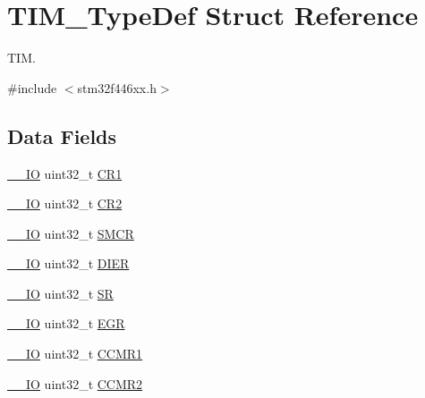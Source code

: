 \hypertarget{struct_t_i_m___type_def}{}\section{T\+I\+M\+\_\+\+Type\+Def Struct Reference}
\label{struct_t_i_m___type_def}


T\+IM.  




{\ttfamily \#include $<$stm32f446xx.\+h$>$}

\subsection*{Data Fields}
\begin{DoxyCompactItemize}
\item 
\mbox{\hyperlink{core__sc300_8h_aec43007d9998a0a0e01faede4133d6be}{\+\_\+\+\_\+\+IO}} uint32\+\_\+t \mbox{\hyperlink{struct_t_i_m___type_def_ab0ec7102960640751d44e92ddac994f0}{C\+R1}}
\item 
\mbox{\hyperlink{core__sc300_8h_aec43007d9998a0a0e01faede4133d6be}{\+\_\+\+\_\+\+IO}} uint32\+\_\+t \mbox{\hyperlink{struct_t_i_m___type_def_afdfa307571967afb1d97943e982b6586}{C\+R2}}
\item 
\mbox{\hyperlink{core__sc300_8h_aec43007d9998a0a0e01faede4133d6be}{\+\_\+\+\_\+\+IO}} uint32\+\_\+t \mbox{\hyperlink{struct_t_i_m___type_def_a2870732a4fc2ecd7bbecfbcbbf5528b7}{S\+M\+CR}}
\item 
\mbox{\hyperlink{core__sc300_8h_aec43007d9998a0a0e01faede4133d6be}{\+\_\+\+\_\+\+IO}} uint32\+\_\+t \mbox{\hyperlink{struct_t_i_m___type_def_a07fccbd85b91e6dca03ce333c1457fcb}{D\+I\+ER}}
\item 
\mbox{\hyperlink{core__sc300_8h_aec43007d9998a0a0e01faede4133d6be}{\+\_\+\+\_\+\+IO}} uint32\+\_\+t \mbox{\hyperlink{struct_t_i_m___type_def_af6aca2bbd40c0fb6df7c3aebe224a360}{SR}}
\item 
\mbox{\hyperlink{core__sc300_8h_aec43007d9998a0a0e01faede4133d6be}{\+\_\+\+\_\+\+IO}} uint32\+\_\+t \mbox{\hyperlink{struct_t_i_m___type_def_a196ebdaac12b21e90320c6175da78ef6}{E\+GR}}
\item 
\mbox{\hyperlink{core__sc300_8h_aec43007d9998a0a0e01faede4133d6be}{\+\_\+\+\_\+\+IO}} uint32\+\_\+t \mbox{\hyperlink{struct_t_i_m___type_def_adb72f64492a75e780dd2294075c70fed}{C\+C\+M\+R1}}
\item 
\mbox{\hyperlink{core__sc300_8h_aec43007d9998a0a0e01faede4133d6be}{\+\_\+\+\_\+\+IO}} uint32\+\_\+t \mbox{\hyperlink{struct_t_i_m___type_def_a091452256c9a16c33d891f4d32b395bf}{C\+C\+M\+R2}}

\end{DoxyCompactItemize}
